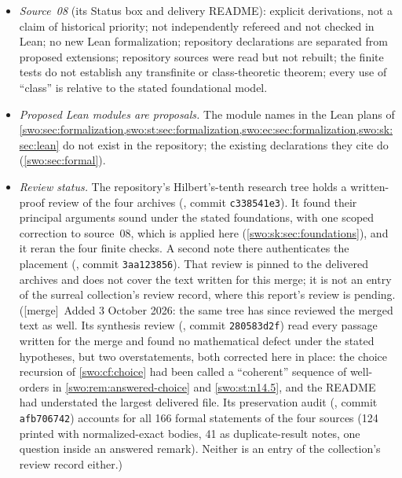 \documentclass[11pt]{article}
\theoremstyle{definition}
\theoremstyle{remark}
\newcommand{\code}[1]{\texttt{\small #1}}
\newcommand{\merge}{\textsf{[merge]}}
\begin{document}
\begin{itemize}
not peer-reviewed or Lean-verified, no historical priority; classical
ingredients and repository results are distinguished from its constructions;
no class whose members are proper classes is formed; the global-enumeration
representation covers set-like class well-orders only, and no complete
classification of the relation-code comparison is claimed; the core realizes
uniform set-sized cuts, not all proper-class cuts (an explicit counterexample
is supplied); for fixed alphabets the absence of $\kappa^+$ and its reverse
is not claimed to be a sufficient embeddability criterion; automorphisms and
higher-level cuts are not classified; its research directions are proposals;
literature and repository searches were targeted, not exhaustive.
\item \emph{Source~08} (its Status box and delivery README): explicit
derivations, not a claim of historical priority; not independently refereed
and not checked in Lean; no new Lean formalization; repository declarations
are separated from proposed extensions; repository sources were read but not
rebuilt; the finite tests do not establish any transfinite or
class-theoretic theorem; every use of ``class'' is relative to the stated
foundational model.
\item \emph{Proposed Lean modules are proposals.} The module names in the
Lean plans of \cref{swo:sec:formalization,swo:st:sec:formalization,swo:ec:sec:formalization,swo:sk:sec:lean}
do not exist in the repository; the existing declarations they cite do
(\cref{swo:sec:formal}).
\item \emph{Review status.} The repository's Hilbert's-tenth research tree
holds a written-proof review of the four archives
(,
commit \code{c338541e3}). It found their principal arguments sound under the
stated foundations, with one scoped correction to source~08, which is applied
here (\cref{swo:sk:sec:foundations}), and it reran the four finite checks.
A second note there authenticates the placement
(, commit \code{3aa123856}). That
review is pinned to the delivered archives and does not cover the text
written for this merge; it is not an entry of the surreal collection's review
record, where this report's review is pending.
(\merge\ Added 3 October 2026: the same tree has since reviewed the merged
text as well. Its synthesis review
(, commit \code{280583d2f}) read
every passage written for the merge and found no mathematical defect under
the stated hypotheses, but two overstatements, both corrected here in
place: the choice recursion of \cref{swo:cf:choice} had been called a
``coherent'' sequence of well-orders in \cref{swo:rem:answered-choice} and
\cref{swo:st:n14.5}, and the README had understated the largest delivered
file. Its preservation audit
(, commit \code{afb706742})
accounts for all 166 formal statements of the four sources (124 printed
with normalized-exact bodies, 41 as duplicate-result notes, one question
inside an answered remark). Neither is an entry of the collection's review
record either.)
\end{itemize}
\end{document}
